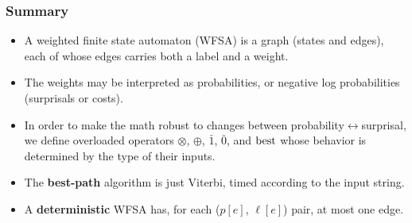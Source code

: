 \documentclass{beamer}
\newcommand{\best}{\operatornamewithlimits{best}}
\begin{document}
\begin{frame}
  \frametitle{Summary}

  \begin{itemize}
  \item A weighted finite state automaton (WFSA) is a graph  (states and edges),
    each of whose edges carries both a label and a weight.
  \item The weights may be interpreted as probabilities, or negative
    log probabilities (surprisals or costs).
  \item In order to make the math robust to changes between
    probability$\leftrightarrow$surprisal, we define overloaded
    operators $\otimes$, $\oplus$, $\bar{1}$, $\bar{0}$, and $\best$
    whose behavior is determined by the type of their inputs.
  \item The {\bf best-path} algorithm is just Viterbi, timed according
    to the input string.
  \item A {\bf deterministic} WFSA has, for each ($p[e]$, $\ell[e]$) pair,
    at most one edge.
  \end{itemize}
\end{frame}
\end{document}
